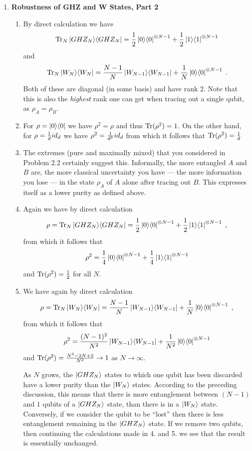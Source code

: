 \documentclass[12pt]{article}
\begin{document}
\begin{enumerate}
\item {\bf Robustness of GHZ and W States, Part 2}

\begin{enumerate}
	\item By direct calculation we have $$\mathrm{Tr}_N \ket{GHZ_N}\!\bra{GHZ_N} = \frac{1}{2}\ket{0}\!\bra{0}^{\otimes {N-1}}+\frac{1}{2}\ket{1}\!\bra{1}^{\otimes {N-1}}$$ and $$\mathrm{Tr}_ N \ket{W_N}\!\bra{W_N} = \frac{N-1}{N}\ket{W_{N-1}}\!\bra{W_{N-1}}+\frac{1}{N}\ket{0}\!\bra{0}^{\otimes {N-1}}\;.$$ Both of these are diagonal (in some basis) and have rank 2. Note that this is also the \emph{highest} rank one can get when tracing out a single qubit, as $\rho_A=\rho_B$.
	
	\item For $\rho =\ket{0}\!\bra{0}$ we have $\rho^2=\rho$ and thus $\mathrm{Tr}(\rho^2)=1$. On the other hand, for $\rho =\frac{1}{d} id_d$ we have $\rho^2=\frac{1}{d^2} id_ d$ from which it follows that $\mathrm{Tr}(\rho^2)=\frac{1}{d}$
	
	\item The extremes (pure and maximally mixed) that you considered in Problem 2.2 certainly suggest this. Informally, the more entangled $A$ and $B$ are, the more classical uncertainty you have --- the more information you lose --- in the state $\rho _ A$ of $A$ alone after tracing out $B$. This expresses itself as a lower purity as defined above.
	
	\item Again we have by direct calculation $$\rho = \mathrm{Tr}_ N \ket{GHZ_N}\!\bra{GHZ_N} = \frac{1}{2}\ket{0}\!\bra{0}^{\otimes {N-1}}+\frac{1}{2}\ket{1}\!\bra{1}^{\otimes {N-1}}\;,$$ from which it follows that $$\rho^2 = \frac{1}{4}\ket{0}\!\bra{0}^{\otimes {N-1}}+\frac{1}{4}\ket{1}\!\bra{1}^{\otimes {N-1}}$$ and $\mathrm{Tr}(\rho^2)=\frac{1}{2}$ for all $N$.
	
	\item We have again by direct calculation
	$$\rho = \mathrm{Tr}_N \ket{W_N}\!\bra{W_N} = \frac{N-1}{N}\ket{W_{N-1}}\!\bra{W_{N-1}}+\frac{1}{N}\ket{0}\!\bra{0}^{\otimes {N-1}}\;,$$ from which it follows that $$\rho ^2 = \frac{(N-1)^2}{N^2}\ket{W_{N-1}}\!\bra{W_{N-1}}+\frac{1}{N^2}\ket{0}\!\bra{0}^{\otimes {N-1}}$$ and $\mathrm{Tr}( \rho ^2) = \frac{N^2-2N+2}{N^2} \rightarrow 1$ as $N \rightarrow \infty$.
	
	As $N$ grows, the $\ket{GHZ_N}$ states to which one qubit has been discarded have a lower purity than the $\ket{W_N}$ states. According to the preceding discussion, this means that there is more entanglement between $(N-1)$ and $1$ qubits of a $\ket{GHZ_N}$ state, than there is in a $\ket{W_N}$ state. Conversely, if we consider the qubit to be ``lost'' then there is less entanglement remaining in the $\ket{GHZ_N}$ state. If we remove two qubits, then continuing the calculations made in 4. and 5. we see that the result is essentially unchanged.
\end{enumerate}


\end{enumerate}
\end{document}
